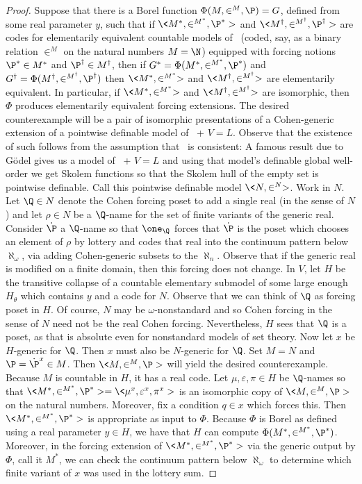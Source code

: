 \documentclass{amsart}
\begin{document}
\begin{proof}
Suppose that there is a Borel function $\Phi(M,\in^M,\P)=G$, defined from some real parameter $y$, such that if $\<M^*,\in^{M^*},\P^*>$ and $\<M^\dagger,\in^{M^\dagger},\P^\dagger>$ are codes for elementarily equivalent countable models of \ZF\ (coded, say, as a binary relation $\in^M$ on the natural numbers $M=\N$) equipped with forcing notions $\P^*\in M^*$ and $\P^\dagger \in M^\dagger$, then if $G^* = \Phi(M^*,\in^{M^*},\P^*)$ and $G^\dagger = \Phi(M^\dagger,\in^{M^\dagger},\P^\dagger)$ then $\<M^*,\in^{M^*}>$ and $\<M^\dagger,\in^{M^\dagger}>$ are elementarily equivalent. In particular, if $\<M^*,\in^{M^*}>$ and $\<M^\dagger,\in^{M^\dagger}>$ are isomorphic, then $\Phi$ produces elementarily equivalent forcing extensions.
The desired counterexample will be a pair of isomorphic presentations of a Cohen-generic extension of a pointwise definable model of \ZF\ + $V = L$. Observe that the existence of such follows from the assumption that \ZF\ is consistent: A famous result due to G\"odel gives us a model of \ZF\ + $V = L$ and using that model's definable global well-order we get Skolem functions so that the Skolem hull of the empty set is pointwise definable. Call this pointwise definable model \hbox{$\<N,\in^N>$}.
Work in $N$. Let $\Q \in N$ denote the Cohen forcing poset to add a single real (in the sense of $N$) and let $\rho \in N$ be a $\Q$-name for the set of finite variants of the generic real. Consider $\dot\P$ a $\Q$-name so that $\one_\Q$ forces that $\dot\P$ is the poset which chooses an element of $\rho$ by lottery and codes that real into the continuum pattern below $\aleph_\omega$, via adding Cohen-generic subsets to the $\aleph_n$. Observe that if the generic real is modified on a finite domain, then this forcing does not change.
In $V$, let $H$ be the transitive collapse of a countable elementary submodel of some large enough $H_\theta$ which contains $y$ and a code for $N$. Observe that we can think of $\Q$ as forcing poset in $H$. Of course, $N$ may be $\omega$-nonstandard and so Cohen forcing in the sense of $N$ need not be the real Cohen forcing. Nevertheless, $H$ sees that $\Q$ is a poset, as that is absolute even for nonstandard models of set theory. Now let $x$ be $H$-generic for $\Q$. Then $x$ must also be $N$-generic for $\Q$. Set $M = N$ and $\P = \dot\P^x \in M$. Then $\<M,\in^M,\P>$ will yield the desired counterexample.
Because $M$ is countable in $H$, it has a real code. Let $\mu,\varepsilon,\pi \in H$ be $\Q$-names so that $\<M^*, \in^{M^*}, \P^*> = \<\mu^x,\varepsilon^x,\pi^x>$ is an isomorphic copy of $\<M,\in^M,\P>$ on the natural numbers. Moreover, fix a condition $q \in x$ which forces this. Then \hbox{$\<M^*, \in^{M^*}, \P^*>$} is appropriate as input to $\Phi$. Because $\Phi$ is Borel as defined using a real parameter $y \in H$, we have that $H$ can compute $\Phi(M^*, \in^{M^*}, \P^*)$. Moreover, in the forcing extension of $\<M^*, \in^{M^*}, \P^*>$ via the generic output by $\Phi$, call it $M^*$, we can check the continuum pattern below $\aleph_\omega$ to determine which finite variant of $x$ was used in the lottery sum.

\end{proof}
\end{document}
